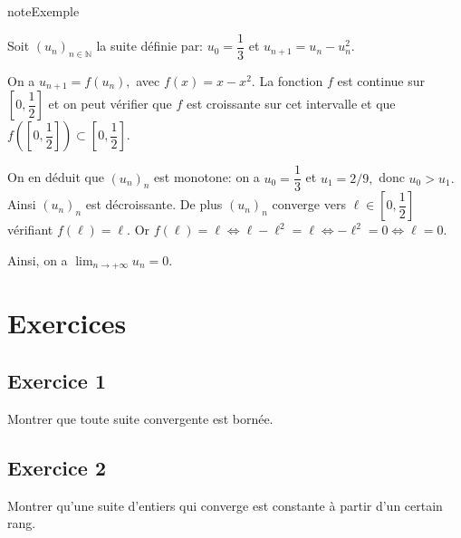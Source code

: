 \documentclass[letterpaper,10pt,french]{jupyterBook}
\begin{document}
\begin{sphinxadmonition}{note}{Exemple}

\sphinxAtStartPar
Soit \((u_n)_{n\in \mathbb{N}}\) la suite définie par: \(u_0=\dfrac{1}{3}\) et \(u_{n+1}=u_n-u_{n}^{2}.\)

\sphinxAtStartPar
On a \(u_{n+1}=f(u_n),\) avec \(f(x)=x-x^2.\) La fonction \(f\) est continue sur \([0,\dfrac{1}{2}]\) et on peut vérifier que \(f\) est croissante sur cet intervalle et que \(f([0,\dfrac{1}{2}])\subset [0,\dfrac{1}{2}].\)

\sphinxAtStartPar
On en déduit que \((u_n)_n\) est monotone: on a \(u_0=\dfrac{1}{3}\) et \(u_1=2/9,\) donc \(u_0> u_1.\) Ainsi \((u_n)_n\) est décroissante. De plus \((u_n)_n\) converge vers \(\ell\in [0,\dfrac{1}{2}]\) vérifiant \(f(\ell)=\ell.\) Or \(f(\ell)=\ell\Leftrightarrow \ell-\ell^2=\ell\Leftrightarrow -\ell^2=0\Leftrightarrow \ell=0.\)

\sphinxAtStartPar
Ainsi, on a \(\lim_{n \rightarrow +\infty}u_n=0.\)
\end{sphinxadmonition}


\section{Exercices}
\label{\detokenize{exo2:exercices}}\label{\detokenize{exo2::doc}}

\subsection{Exercice 1}
\label{\detokenize{exo2:exercice-1}}
\sphinxAtStartPar
Montrer que toute suite convergente est bornée.


\subsection{Exercice 2}
\label{\detokenize{exo2:exercice-2}}
\sphinxAtStartPar
Montrer qu’une suite d’entiers qui converge est constante à partir d’un certain rang.
\end{document}
